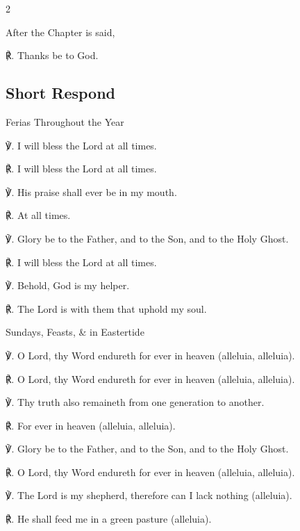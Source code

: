 \begin{multicols}{2}
\begin{rubric}
	After the Chapter is said,
\end{rubric}
℟. Thanks be to God.



\subsection{Short Respond}


\begin{inhead}
	Ferias Throughout the Year
\end{inhead}
℣. I will bless the Lord at all times.

℟. I will bless the Lord at all times.

℣. His praise shall ever be in my mouth.

℟. At all times.

℣. Glory be to the Father, and to the Son, and to the Holy Ghost.

℟. I will bless the Lord at all times.%

℣. Behold, God is my helper.

℟. The Lord is with them that uphold my soul.

\begin{inhead}
	Sundays, Feasts, \& in Eastertide
\end{inhead}

℣. O Lord, thy Word endureth for ever in heaven (alleluia, alleluia).

℟. O Lord, thy Word endureth for ever in heaven (alleluia, alleluia).

℣. Thy truth also remaineth from one generation to another.

℟. For ever in heaven (alleluia, alleluia).

℣. Glory be to the Father, and to the Son, and to the Holy Ghost.

℟. O Lord, thy Word endureth for ever in heaven (alleluia, alleluia).

℣. The Lord is my shepherd, therefore can I lack nothing (alleluia).

℟. He shall feed me in a green pasture (alleluia).



\end{multicols}
